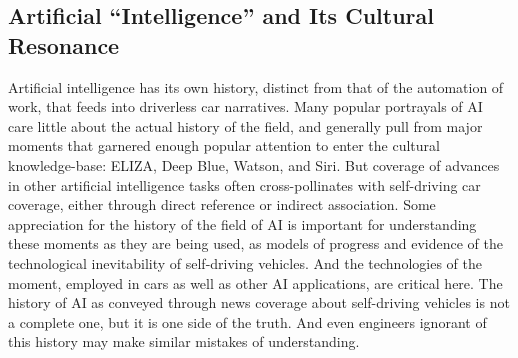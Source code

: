 \subsection{Artificial ``Intelligence'' and Its Cultural Resonance}
Artificial intelligence has its own history, distinct from that of the
automation of work, that feeds into driverless car narratives. Many popular
portrayals of AI care little about the actual history of the field,
and generally pull from major moments that garnered enough popular
attention to enter the cultural knowledge-base: ELIZA, Deep Blue,
Watson, and Siri. But coverage of advances in other artificial
intelligence tasks often cross-pollinates with self-driving car
coverage, either through direct reference or indirect association.
Some appreciation for the history of the field
of AI is important for understanding these moments as they are being
used, as models of progress and evidence of the technological inevitability of
self-driving vehicles. And the technologies of the moment, employed in
cars as well as other AI applications, are critical here. The history
of AI as conveyed through news coverage about self-driving vehicles is
not a complete one, but it is one side of the truth. And even
engineers ignorant of this history may make similar mistakes of understanding.

